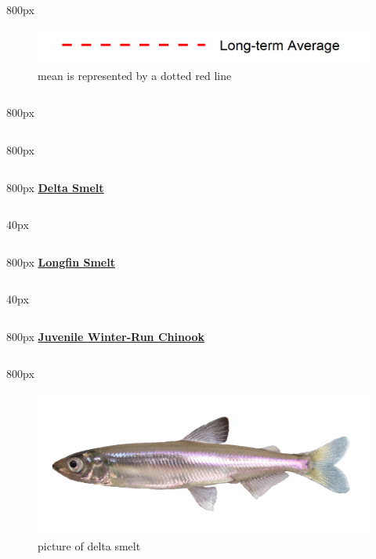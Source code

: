 \documentclass[
]{book}
\begin{document}
\begin{column}{800px\textwidth}
\begin{figure}
\includegraphics[width=15.25in]{figures/mline} \caption{mean is represented by a dotted red line}\label{fig:unnamed-chunk-39}
\end{figure}
\end{column}

\begin{column}{800px\textwidth}
\end{column}

\begin{column}{800px\textwidth}
\end{column}

\begin{column}{800px\textwidth}
\textbf{\href{http://calfish.ucdavis.edu/species/?uid=47\&ds=698}{Delta Smelt}}
\end{column}

\begin{column}{40px\textwidth}
~
\end{column}

\begin{column}{800px\textwidth}
\textbf{\href{http://calfish.ucdavis.edu/species/?uid=87\&ds=698}{Longfin Smelt}}
\end{column}

\begin{column}{40px\textwidth}
~
\end{column}

\begin{column}{800px\textwidth}
\textbf{\href{http://calfish.ucdavis.edu/species/?uid=30\&ds=698}{Juvenile Winter-Run Chinook}}
\end{column}

\begin{column}{800px\textwidth}
\begin{figure}

{\centering \includegraphics[width=29.17in]{figures/delta_smelt} 

}

\caption{picture of delta smelt}\label{fig:unnamed-chunk-40}
\end{figure}
\end{column}
\end{document}
